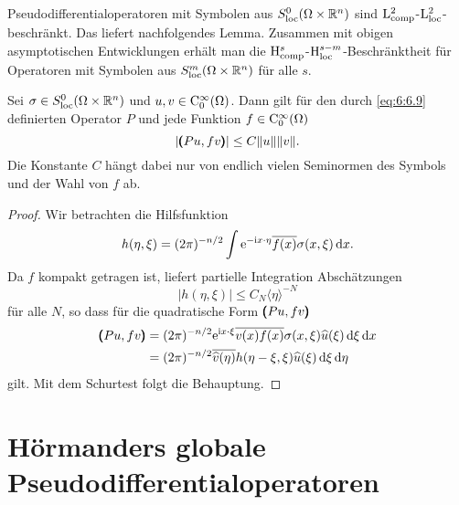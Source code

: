 Pseudodifferentialoperatoren mit Symbolen aus $S^0_{\rm loc}(\Omega\times\mathbb R^n)$ sind $\mathrm L^2_{\rm comp}$-$\mathrm L^2_{\rm loc}$-beschränkt. Das liefert nachfolgendes Lemma. Zusammen mit obigen asymptotischen Entwicklungen erhält man die $\mathrm H^s_{\rm comp}$-$\mathrm H^{s-m}_{\rm loc}$-Beschränktheit für Operatoren mit Symbolen aus $S^m_{\rm loc}(\Omega\times\mathbb R^n)$ für alle $s$.
\begin{lem}
Sei $\sigma\in S^0_{\rm loc}(\Omega\times\mathbb R^n)$ und $u,v\in\mathrm C_0^\infty(\Omega)$. Dann gilt für den durch \eqref{eq:6:6.9} definierten Operator $P$
und jede Funktion $f\in\mathrm C_0^\infty(\Omega)$
\begin{equation}
   | \pmb(Pu,f v\pmb) | \le C \|u\|\|v\|.
\end{equation}
Die Konstante $C$ hängt dabei nur von endlich vielen Seminormen des Symbols und der Wahl von $f$ ab.
\end{lem}
\begin{proof}
Wir betrachten die Hilfsfunktion
\begin{equation}\label{eq:6:h-def}
  h(\eta,\xi) =  (2\pi)^{-n/2} \int \mathrm e^{-\mathrm i x\cdot\eta} \overline{f(x)} \sigma(x,\xi) \,\mathrm d x.
\end{equation}
Da $f$ kompakt getragen ist, liefert partielle Integration Abschätzungen
\begin{equation}
   |h(\eta,\xi)|  \le C_N \langle\eta\rangle^{-N}
\end{equation}
für alle $N$, so dass für die quadratische Form $\pmb(Pu,fv\pmb)$
\begin{equation}
\begin{split}
   \pmb(Pu,fv\pmb) &= (2\pi)^{-n/2} \relax \mathrm e^{\mathrm i x\cdot \xi}\overline{ v(x) f(x)} \sigma(x,\xi) \widehat u(\xi)\,\mathrm d\xi\,\mathrm d x\\
   &= (2\pi)^{-n/2} \relax \overline{ \widehat v(\eta) }h(\eta-\xi,\xi) \widehat u(\xi)\,\mathrm d\xi\,\mathrm d\eta
\end{split}
\end{equation}
gilt. Mit dem Schurtest folgt die Behauptung.
\end{proof}

\section{Hörmanders globale Pseudodifferentialoperatoren}

